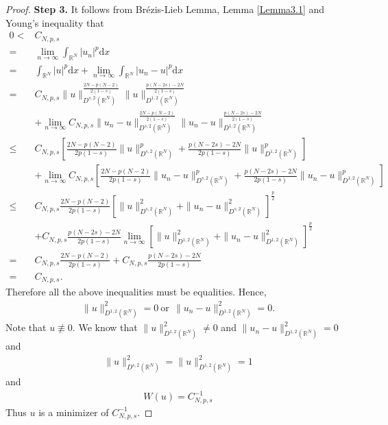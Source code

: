 \documentclass[12pt,a4paper,reqno]{amsart}
\numberwithin{equation}{section}
\begin{document}
\begin{proof}
{\bf Step 3.}
It follows from Brézis-Lieb Lemma, Lemma \ref{Lemma3.1} and Young's inequality that
\begin{equation*}
\begin{aligned}
0<&C_{N,p,s}\\
=&\lim\limits_{n\to\infty}
\int_{\mathbb{R}^{N}}
|u_{n}|^{p}
\mathrm{d}x\\
=&
\int_{\mathbb{R}^{N}}
|u|^{p}
\mathrm{d}x
+\lim\limits_{n\to\infty}
\int_{\mathbb{R}^{N}}
|u_{n}-u|^{p}
\mathrm{d}x\\
=&
C_{N,p,s}
\|u\|_{D^{s,2}(\mathbb{R}^{N})}^{\frac{2N-p(N-2)}{2(1-s)}}
\|u\|_{D^{1,2}(\mathbb{R}^{N})}^{\frac{p(N-2s)-2N}{2(1-s)}}\\
&+\lim\limits_{n\to\infty}
C_{N,p,s}
\|u_{n}-u\|_{D^{s,2}(\mathbb{R}^{N})}^{\frac{2N-p(N-2)}{2(1-s)}}
\|u_{n}-u\|_{D^{1,2}(\mathbb{R}^{N})}^{\frac{p(N-2s)-2N}{2(1-s)}}\\
\leqslant&
C_{N,p,s}
\left[
\frac{2N-p(N-2)}{2p(1-s)}
\|u\|_{D^{s,2}(\mathbb{R}^{N})}^{p}
+\frac{p(N-2s)-2N}{2p(1-s)}
\|u\|_{D^{1,2}(\mathbb{R}^{N})}^{p}
\right]\\
&+\lim\limits_{n\to\infty}
C_{N,p,s}
\left[
\frac{2N-p(N-2)}{2p(1-s)}
\|u_{n}-u\|_{D^{s,2}(\mathbb{R}^{N})}^{p}
+\frac{p(N-2s)-2N}{2p(1-s)}
\|u_{n}-u\|_{D^{1,2}(\mathbb{R}^{N})}^{p}
\right]\\
\leqslant&
C_{N,p,s}
\frac{2N-p(N-2)}{2p(1-s)}
\left[
\|u\|_{D^{s,2}(\mathbb{R}^{N})}^{2}
+
\|u_{n}-u\|_{D^{s,2}(\mathbb{R}^{N})}^{2}
\right]^{\frac{p}{2}}\\
&+C_{N,p,s}
\frac{p(N-2s)-2N}{2p(1-s)}
\lim\limits_{n\to\infty}
\left[
\|u\|_{D^{1,2}(\mathbb{R}^{N})}^{2}
+
\|u_{n}-u\|_{D^{1,2}(\mathbb{R}^{N})}^{2}
\right]^{\frac{p}{2}}\\
=&C_{N,p,s}
\frac{2N-p(N-2)}{2p(1-s)}
+C_{N,p,s}
\frac{p(N-2s)-2N}{2p(1-s)}\\
=&C_{N,p,s}.
\end{aligned}
\end{equation*}
Therefore all the above inequalities must be equalities. Hence,
\begin{equation*}
\begin{aligned}
\|u\|_{D^{1,2}(\mathbb{R}^{N})}^{2}=0~
\mathrm{or}~~\|u_{n}-u\|_{D^{1,2}(\mathbb{R}^{N})}^{2}=0.
\end{aligned}
\end{equation*}
Note that $u\not\equiv0$. We know that $\|u\|_{D^{1,2}(\mathbb{R}^{N})}^{2}\not=0$ and $\|u_{n}-u\|_{D^{1,2}(\mathbb{R}^{N})}^{2}=0$ and
\begin{equation*}
\begin{aligned}
\|u\|_{D^{s,2}(\mathbb{R}^{N})}^{2}
=
\|u\|_{D^{1,2}(\mathbb{R}^{N})}^{2}
=1
\end{aligned}
\end{equation*}
and
\begin{equation*}
\begin{aligned}
W(u)=C_{N,p,s}^{-1}
\end{aligned}
\end{equation*}
Thus $u$ is a minimizer of $C_{N,p,s}^{-1}$.
\end{proof}
\end{document}
